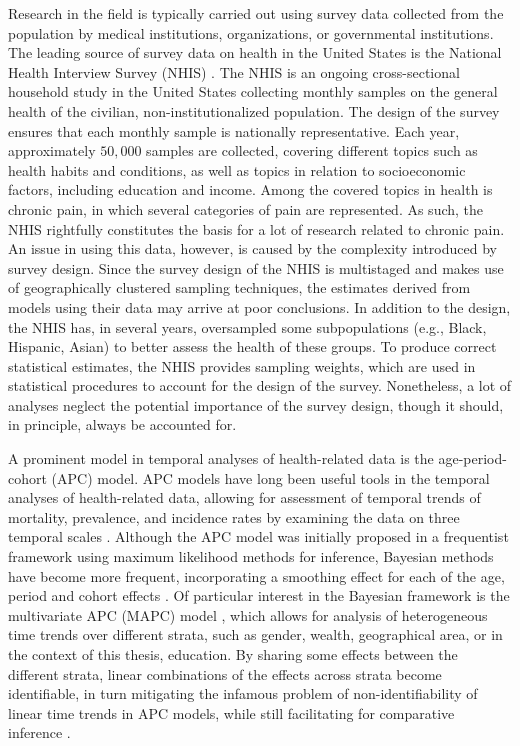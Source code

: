 Research in the field is typically carried out using survey data collected from the population by medical institutions, organizations, or governmental institutions. The leading source of survey data on health in the United States is the National Health Interview Survey (NHIS) \citep{NHIS-original}. The NHIS is an ongoing cross-sectional household study in the United States collecting monthly samples on the general health of the civilian, non-institutionalized population. The design of the survey ensures that each monthly sample is nationally representative. Each year, approximately $50,000$ samples are collected, covering different topics such as health habits and conditions, as well as topics in relation to socioeconomic factors, including education and income. Among the covered topics in health is chronic pain, in which several categories of pain are represented. As such, the NHIS rightfully constitutes the basis for a lot of research related to chronic pain. An issue in using this data, however, is caused by the complexity introduced by survey design. Since the survey design of the NHIS is multistaged and makes use of geographically clustered sampling techniques, the estimates derived from models using their data may arrive at poor conclusions. In addition to the design, the NHIS has, in several years, oversampled some subpopulations (e.g., Black, Hispanic, Asian) to better assess the health of these groups. To produce correct statistical estimates, the NHIS provides sampling weights, which are used in statistical procedures to account for the design of the survey. Nonetheless, a lot of analyses neglect the potential importance of the survey design, though it should, in principle, always be accounted for.

A prominent model in temporal analyses of health-related data is the age-period-cohort (APC) model. APC models have long been useful tools in the temporal analyses of health-related data, allowing for assessment of temporal trends of mortality, prevalence, and incidence rates by examining the data on three temporal scales \citep{APC-OLD, APC-OLD-2, APC-OLD-3}. Although the APC model was initially proposed in a frequentist framework using maximum likelihood methods for inference, Bayesian methods have become more frequent, incorporating a smoothing effect for each of the age, period and cohort effects \citep{APC-Bayesian-Yang, APC-Bayesian-Held}. Of particular interest in the Bayesian framework is the multivariate APC (MAPC) model \citep{hansell2003copd, jacobsen2004women}, which allows for analysis of heterogeneous time trends over different strata, such as gender, wealth, geographical area, or in the context of this thesis, education. By sharing some effects between the different strata, linear combinations of the effects across strata become identifiable, in turn mitigating the infamous problem of non-identifiability of linear time trends in APC models, while still facilitating for comparative inference \citep{APC-Bayesian-Andrea}. 

